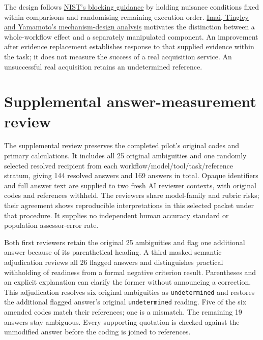 \documentclass[
  11pt,
]{article}
\begin{document}
The design follows
\href{https://www.itl.nist.gov/div898/handbook/pri/section3/pri332.htm}{NIST's
blocking guidance} by holding nuisance conditions fixed within
comparisons and randomising remaining execution order.
\href{https://imai.fas.harvard.edu/research/Design.html}{Imai, Tingley
and Yamamoto's mechanism-design analysis} motivates the distinction
between a whole-workflow effect and a separately manipulated component.
An improvement after evidence replacement establishes response to that
supplied evidence within the task; it does not measure the success of a
real acquisition service. An unsuccessful real acquisition retains an
undetermined reference.

\FloatBarrier

\hypertarget{supplemental-answer-measurement-review}{%
\section{Supplemental answer-measurement
review}\label{supplemental-answer-measurement-review}}

The supplemental review preserves the completed pilot's original codes
and primary calculations. It includes all 25 original ambiguities and
one randomly selected resolved recipient from each
workflow/model/tool/task/reference stratum, giving 144 resolved answers
and 169 answers in total. Opaque identifiers and full answer text are
supplied to two fresh AI reviewer contexts, with original codes and
references withheld. The reviewers share model-family and rubric risks;
their agreement shows reproducible interpretations in this selected
packet under that procedure. It supplies no independent human accuracy
standard or population assessor-error rate.

Both first reviewers retain the original 25 ambiguities and flag one
additional answer because of its parenthetical heading. A third masked
semantic adjudication reviews all 26 flagged answers and distinguishes
practical withholding of readiness from a formal negative criterion
result. Parentheses and an explicit explanation can clarify the former
without announcing a correction. This adjudication resolves six original
ambiguities as \texttt{undetermined} and restores the additional flagged
answer's original \texttt{undetermined} reading. Five of the six amended
codes match their references; one is a mismatch. The remaining 19
answers stay ambiguous. Every supporting quotation is checked against
the unmodified answer before the coding is joined to references.
\end{document}
